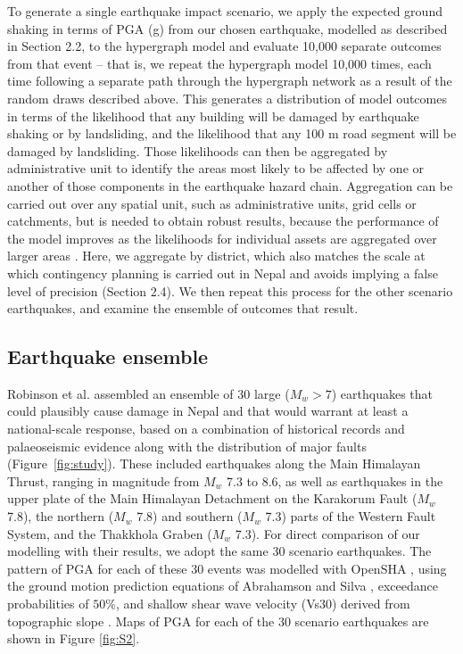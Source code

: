 \documentclass[preprint,12pt,authoryear]{elsarticle}
\begin{document}
To generate a single earthquake impact scenario, we apply the expected ground shaking in terms of PGA (g) from our chosen earthquake, modelled as described in Section 2.2, to the hypergraph model and evaluate 10,000 separate outcomes from that event -- that is, we repeat the hypergraph model 10,000 times, each time following a separate path through the hypergraph network as a result of the random draws described above. This generates a distribution of model outcomes in terms of the likelihood that any building will be damaged by earthquake shaking or by landsliding, and the likelihood that any 100 m road segment will be damaged by landsliding. Those likelihoods can then be aggregated by administrative unit to identify the areas most likely to be affected by one or another of those components in the earthquake hazard chain. Aggregation can be carried out over any spatial unit, such as administrative units, grid cells or catchments, but is needed to obtain robust results, because the performance of the model improves as the likelihoods for individual assets are aggregated over larger areas \citep{Dunant2025}. Here, we aggregate by district, which also matches the scale at which contingency planning is carried out in Nepal and avoids implying a false level of precision (Section 2.4). We then repeat this process for the other scenario earthquakes, and examine the ensemble of outcomes that result.

\subsection{Earthquake ensemble}

Robinson et al. \citep{Robinson2018} assembled an ensemble of 30 large ($M_w > 7$) earthquakes that could plausibly cause damage in Nepal and that would warrant at least a national-scale response, based on a combination of historical records and palaeoseismic evidence along with the distribution of major faults (Figure~\ref{fig:study}). These included earthquakes along the Main Himalayan Thrust, ranging in magnitude from $M_w$ 7.3 to 8.6, as well as earthquakes in the upper plate of the Main Himalayan Detachment on the Karakorum Fault ($M_w$ 7.8), the northern ($M_w$ 7.8) and southern ($M_w$ 7.3) parts of the Western Fault System, and the Thakkhola Graben ($M_w$ 7.3). For direct comparison of our modelling with their results, we adopt the same 30 scenario earthquakes. The pattern of PGA for each of these 30 events was modelled with OpenSHA \citep{Field2003}, using the ground motion prediction equations of Abrahamson and Silva \citep{Abrahamson2008}, exceedance probabilities of $\text{50\%}$, and shallow shear wave velocity (Vs30) derived from topographic slope \citep{Allen2009}. Maps of PGA for each of the 30 scenario earthquakes are shown in Figure \ref{fig:S2}.
\end{document}

